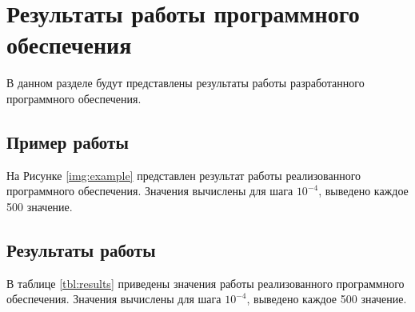 \chapter{Результаты работы программного обеспечения}

В данном разделе будут представлены результаты работы разработанного программного обеспечения.

\section{Пример работы}

На Рисунке \ref{img:example} представлен результат работы реализованного программного обеспечения. Значения вычислены для шага $10^{-4}$, выведено каждое 500 значение.


\section{Результаты работы}

В таблице \ref{tbl:results} приведены значения работы реализованного программного обеспечения. Значения вычислены для шага $10^{-4}$, выведено каждое 500 значение.

